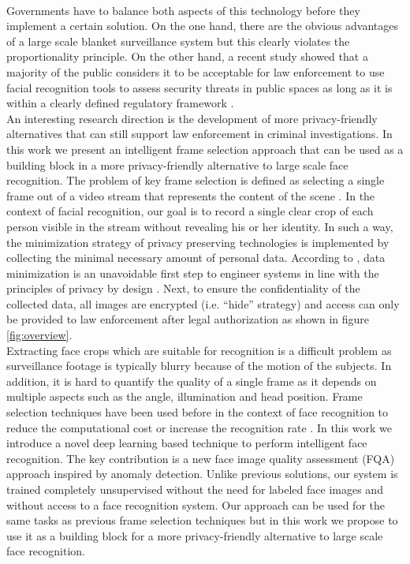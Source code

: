 \documentclass[letterpaper]{article} %
\begin{document}
\\
\newline
Governments have to balance both aspects of this technology before they implement a certain solution. On the one hand, there are the obvious advantages of a large scale blanket surveillance system but this clearly violates the proportionality principle. On the other hand, a recent study showed that a majority of the public considers it to be acceptable for law enforcement to use facial recognition tools to assess security threats in public spaces as long as it is within a clearly defined regulatory framework \cite{smith2019more}.
\\
An interesting research direction is the development of more privacy-friendly alternatives that can still support law enforcement in criminal investigations. In this work we present an intelligent frame selection approach that can be used as a building block in a more privacy-friendly alternative to large scale face recognition. The problem of key frame selection is defined as selecting a single frame out of a video stream that represents the content of the scene \cite{wolf1996key}. In the context of facial recognition, our goal is to record a single clear crop of each person visible in the stream without revealing his or her identity. In such a way, the minimization strategy of privacy preserving technologies \cite{DomingoFerrer2020} is implemented by collecting the minimal necessary amount of personal data.
According to \cite{duncan2007engineering}, data minimization is an unavoidable first step to engineer systems in line with the principles of privacy by design \cite{cavoukian2009privacy}. Next, to ensure the confidentiality of the collected data, all images are encrypted (i.e. ``hide'' strategy) and access can only be provided to law enforcement after legal authorization as shown in figure \ref{fig:overview}.
\\
\newline
Extracting face crops which are suitable for recognition is a difficult problem as surveillance footage is typically blurry because of the motion of the subjects. In addition, it is hard to quantify the quality of a single frame as it depends on multiple aspects such as the angle, illumination and head position. Frame selection techniques have been used before in the context of face recognition  to reduce the computational cost or increase the recognition rate \cite{wong_cvprw_2011, anantharajah2012quality, qi2018boosting, vignesh2015face, best2017automatic, hernandez2020biometric, terhorst2020ser}. In this work we introduce a novel deep learning based technique to perform intelligent face recognition. The key contribution is a new face image quality assessment (FQA) approach inspired by anomaly detection. Unlike previous solutions, our system is trained completely unsupervised without the need for labeled face images and without access to a face recognition system. Our approach can be used for the same tasks as previous frame selection techniques but in this work we propose to use it as a building block for a more privacy-friendly alternative to large scale face recognition.
\end{document}
